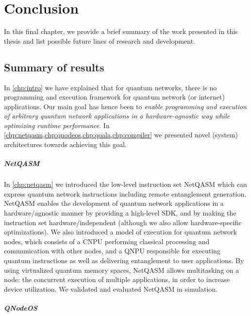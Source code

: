 \chapter{Conclusion}
\label{chp:conclusion}

In this final chapter, we provide a brief summary of the work presented in this thesis and list possible future lines of research and development.

\section{Summary of results}
In \cref{chp:intro} we have explained that for quantum networks, there is no programming and execution framework for quantum network (or internet) applications.
Our main goal has hence been to \emph{enable programming and execution of arbitrary quantum network applications in a hardware-agnostic way while optimizing runtime performance}.
In \cref{chp:netqasm,chp:qnodeos,chp:qoala,chp:compiler} we presented novel (system) architectures towards achieving this goal.


\paragraph{NetQASM}
In \cref{chp:netqasm} we introduced the low-level instruction set NetQASM which can express quantum network instructions including remote entanglement generation.
NetQASM enables the development of quantum network applications in a hardware\-/agnostic manner by providing a high-level SDK, and by making the instruction set hardware\-/independent (although we also allow hardware-specific optimizations).
We also introduced a model of execution for quantum network nodes, which consists of a CNPU performing classical processing and communication with other nodes, and a QNPU responsible for executing quantum instructions as well as delivering entanglement to user applications.
By using virtualized quantum memory spaces, NetQASM allows multitasking on a node: the concurrent execution of multiple applications, in order to increase device utilization.
We validated and evaluated NetQASM in simulation.


\paragraph{QNodeOS}

